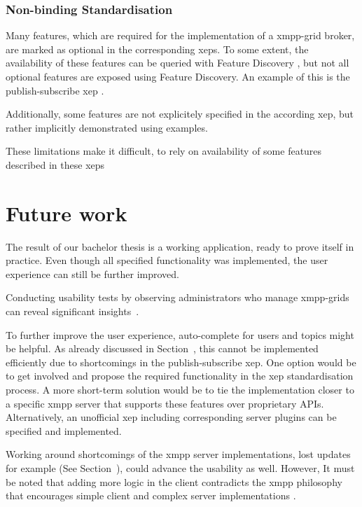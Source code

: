 \subsubsection{Non-binding Standardisation}

Many features, which are required for the implementation of a \gls{xmpp-grid} \gls{broker}, are marked as optional in the corresponding \glspl{xep}.
To some extent, the availability of these features can be queried with Feature Discovery \cite{xep-0030}, but not all optional features are exposed using Feature Discovery.
An example of this is the \gls{publish-subscribe} \gls{xep} \cite{xep-0060}.

Additionally, some features are not explicitely specified in the according \gls{xep}, but rather implicitly demonstrated using examples.

These limitations make it difficult, to rely on availability of some features described in these \glspl{xep}


\section{Future work}
The result of our bachelor thesis is a working application, ready to prove itself in practice.
Even though all specified functionality was implemented, the user experience can still be further improved.

Conducting usability tests by observing administrators who manage \glspl{xmpp-grid} can reveal significant insights~\cite{krug:dont-make-me-think}.

To further improve the user experience, auto-complete for users and topics might be helpful.
As already discussed in Section~, this cannot be implemented efficiently due to shortcomings in the \gls{publish-subscribe} \gls{xep}.
One option would be to get involved and propose the required functionality in the \gls{xep} standardisation process.
A more short-term solution would be to tie the implementation closer to a specific \gls{xmpp} server that supports these features over proprietary APIs.
Alternatively, an unofficial \gls{xep} including corresponding server plugins can be specified and implemented.

Working around shortcomings of the \gls{xmpp} server implementations, lost updates for example (See Section~), could advance the usability as well.
However, It must be noted that adding more logic in the client contradicts the \gls{xmpp} philosophy that encourages simple client and complex server implementations \cite{definitive-guide-xmpp}.


